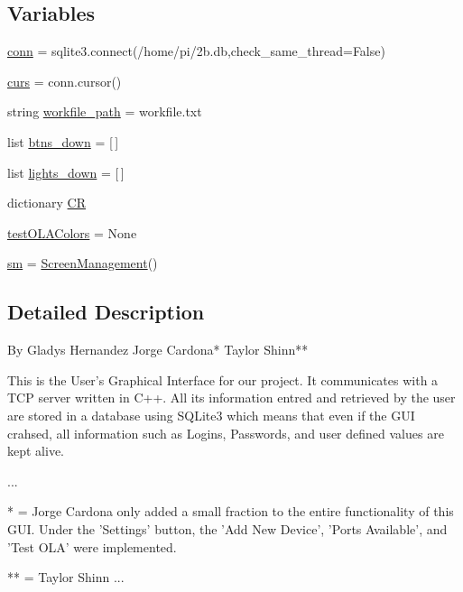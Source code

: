 \subsection*{Variables}
\begin{DoxyCompactItemize}
\item 
\hyperlink{namespaceGUI8_a49010b9a16980db6e87f54580689492d}{conn} = sqlite3.\+connect(\textquotesingle{}/home/pi/2b.\+db\textquotesingle{},check\+\_\+same\+\_\+thread=\+False)
\item 
\hyperlink{namespaceGUI8_a9d14617d09e50247fc7d7b65ea35c514}{curs} = conn.\+cursor()
\item 
string \hyperlink{namespaceGUI8_af0654d56d4c69d04e37a97e1240d257c}{workfile\+\_\+path} = \textquotesingle{}workfile.\+txt\textquotesingle{}
\item 
list \hyperlink{namespaceGUI8_a1178839be878c3171e22a33b1a00c9c1}{btns\+\_\+down} = \mbox{[}$\,$\mbox{]}
\item 
list \hyperlink{namespaceGUI8_a2be349e413c2c9022ec2b4b50bdeb547}{lights\+\_\+down} = \mbox{[}$\,$\mbox{]}
\item 
dictionary \hyperlink{namespaceGUI8_a431c9ff481f8df6f970a9227b18630ec}{CR}
\item 
\hyperlink{namespaceGUI8_a9452e2e26352526a966150d962e784e7}{test\+O\+L\+A\+Colors} = None
\item 
\hyperlink{namespaceGUI8_aa76ce78e0e5cc6e178b5745dae6ee144}{sm} = \hyperlink{classGUI8_1_1ScreenManagement}{Screen\+Management}()
\end{DoxyCompactItemize}


\subsection{Detailed Description}
\begin{DoxyVerb}By Gladys Hernandez
   Jorge Cardona*
   Taylor Shinn**

This is the User's Graphical Interface for our project.
It communicates with a TCP server written in C++.
All its information entred and retrieved by the user
are stored in a database using SQLite3 which means that even
if the GUI crahsed, all information such as Logins, Passwords, and
user defined values are kept alive.

...

* = Jorge Cardona only added a small fraction to the entire functionality 
of this GUI. Under the 'Settings' button, the 'Add New Device', 'Ports Available',
and 'Test OLA' were implemented.

** = Taylor Shinn ...\end{DoxyVerb}
 

